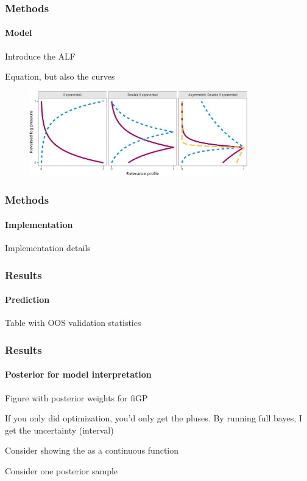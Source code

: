 \documentclass{snedecorbeamer}
\begin{document}
\begin{frame}
  \frametitle{Methods}
  \framesubtitle{Model}

  Introduce the ALF

  Equation, but also the curves

  \begin{figure}
    \centering
    \includegraphics[height=10em]{inc/mls_weight_profiles}
  \end{figure}
\end{frame}

\begin{frame}
  \frametitle{Methods}
  \framesubtitle{Implementation}

  Implementation details
\end{frame}

\begin{frame}
  \frametitle{Results}
  \framesubtitle{Prediction}

  Table with OOS validation statistics

  \begin{table}
    \caption{Mean validation statistics:~RMSE (left) and negative PPLD (right).
      Smaller values are better. Bold is best in class.
    }%
    \label{tab:validation-statistics-mini}
  \end{table}

\end{frame}

\begin{frame}
  \frametitle{Results}
  \framesubtitle{Posterior for model interpretation}

  Figure with posterior weights for fiGP

  If you only did optimization, you'd only get the pluses. By running full
  bayes, I get the uncertainty (interval)

  Consider showing the as a continuous function

  Consider one posterior sample
\end{frame}
\end{document}
